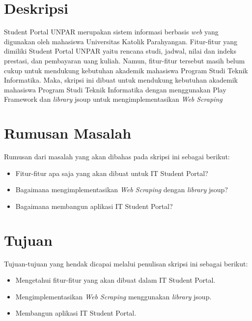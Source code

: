 \documentclass[a4paper,twoside]{article}
\begin{document}
\title{\@judultopik}
\author{\nama \textendash \@npm} 

\newcommand{\nama}{Herfan Heryandi}
\newcommand{\@npm}{2012730012}
\newcommand{\@judultopik}{IT Student Portal: Pemanfaatan \textit{Web Scraping} untuk Kustomisasi Student Portal UNPAR} %
\newcommand{\jumpemb}{1} %
\newcommand{\tanggal}{20/06/2015}
\maketitle


\section{Deskripsi}
Student Portal UNPAR merupakan sistem informasi berbasis \textit{web} yang digunakan oleh mahasiswa Universitas Katolik Parahyangan. Fitur-fitur yang dimiliki Student Portal UNPAR yaitu rencana studi, jadwal, nilai dan indeks prestasi, dan pembayaran uang kuliah. Namun, fitur-fitur tersebut masih belum cukup untuk mendukung kebutuhan akademik mahasiswa Program Studi Teknik Informatika. Maka, skripsi ini dibuat untuk mendukung kebutuhan akademik mahasiswa Program Studi Teknik Informatika dengan menggunakan Play Framework dan \textit{library} jsoup untuk mengimplementasikan \textit{Web Scraping}

\section{Rumusan Masalah}
Rumusan dari masalah yang akan dibahas pada skripsi ini sebagai
berikut:
\begin{itemize}
	\item Fitur-fitur apa saja yang akan dibuat untuk IT Student Portal?
	\item Bagaimana mengimplementasikan \textit{Web Scraping} dengan \textit{library} jsoup?
	\item Bagaimana membangun aplikasi IT Student Portal?
\end{itemize}

\section{Tujuan}
Tujuan-tujuan yang hendak dicapai melalui penulisan skripsi ini sebagai berikut:
\begin{itemize}
	\item	Mengetahui fitur-fitur yang akan dibuat dalam IT Student Portal.
	\item	Mengimplementasikan \textit{Web Scraping} menggunakan \textit{library} jsoup.
	\item Membangun aplikasi IT Student Portal.
\end{itemize}
\end{document}
